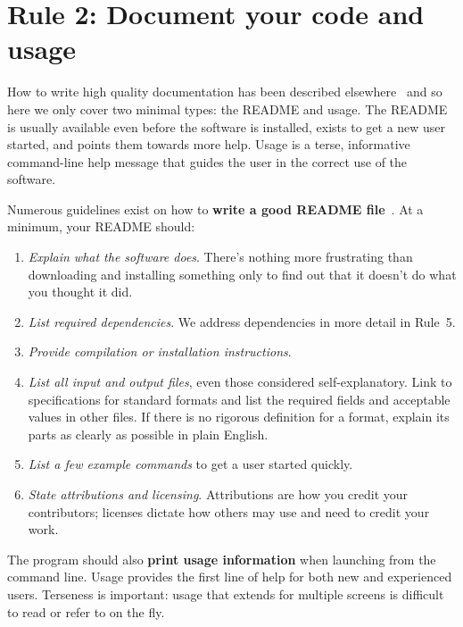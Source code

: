 \documentclass[10pt,letterpaper]{article}
\newcommand{\rulemajor}[1]{\section{#1}}
\newcommand{\ruleminor}[1]{\textbf{#1}}
\begin{document}
\rulemajor{Rule 2: Document your code and usage}

How to write high quality documentation has been described
elsewhere~\cite{karimzadeh2016} and so here we only cover two minimal
types: the README and usage.  The README is usually available even
before the software is installed, exists to get a new user started,
and points them towards more help. Usage is a terse, informative
command-line help message that guides the user in the correct use of
the software.

Numerous guidelines exist on how to \ruleminor{write a good README
file}~\cite{Johnson1997,gnustandards}.  At a minimum, your README
should:

\begin{enumerate}

\item
  \textit{Explain what the software does}.  There's nothing more
  frustrating than downloading and installing something only to find
  out that it doesn't do what you thought it did.

\item
  \textit{List required dependencies}.  We address dependencies in
  more detail in Rule~5.

\item
  \textit{Provide compilation or installation instructions}.

\item
  \textit{List all input and output files}, even those considered
  self-explanatory.  Link to specifications for standard formats and
  list the required fields and acceptable values in other files.  If
  there is no rigorous definition for a format, explain its parts as
  clearly as possible in plain English.

\item
  \textit{List a few example commands} to get a user started quickly.

\item
  \textit{State attributions and licensing}. Attributions are how you
  credit your contributors; licenses dictate how others may use and
  need to credit your work.

\end{enumerate}

The program should also \ruleminor{print usage information} when
launching from the command line.  Usage provides the first line of
help for both new and experienced users.  Terseness is important:
usage that extends for multiple screens is difficult to read or refer
to on the fly.
\end{document}
